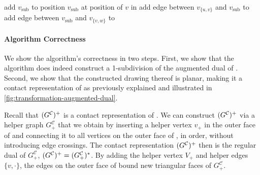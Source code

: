 \begin{algorithm}[H]
{    \label{line:transformation-loop3-start}
    add  $v_\text{sub}$ to \initmap{}\; \label{line:transformation-subdivisionvertex3}
    position $v_\text{sub}$ at position of $v$ in \clustergraph{}\;
    add edge between $v_{\{u,v\}}$ and $v_\text{sub}$ to \initmap{}\; \label{line:transformation-edgetype3-start}
    add edge between $v_\text{sub}$ and $v_{\{v,w\}}$ to \initmap{}\; \label{line:transformation-edgetype3-end}
    \label{line:transformation-loop3-end}
  }
  \Return \initmap{}
\end{algorithm}
\vfill



\paragraph{Algorithm Correctness}

We show the algorithm's correctness in two steps.
First, we show that the algorithm does indeed construct a 1-subdivision of the augmented dual of \clustergraph{}.
Second, we show that the constructed drawing thereof is planar, making it a contact representation of \clustergraph{} as previously explained and illustrated in \cref{fig:transformation-augmented-dual}.

Recall that $(G^\mathcal{C}_{})^+$ is a contact representation of \clustergraph{}.
We can construct $(G^\mathcal{C}_{})^+$ via a helper graph $G_+^\mathcal{C}$ that we obtain by inserting a helper vertex $v_+$ in the outer face of \clustergraph{} and connecting it to all vertices on the outer face of \clustergraph{}, in order, without introducing edge crossings.
The contact representation $(G^\mathcal{C}_{})^+$ then is the regular dual of $G_+^\mathcal{C}$, \ie{} $(G^\mathcal{C}_{})^+ = (G_+^\mathcal{C})^*$.
By adding the helper vertex $V_+$ and helper edges $\{v,\cdot\}$, the edges on the outer face of \clustergraph{} bound new triangular faces of $G_+^\mathcal{C}$.

